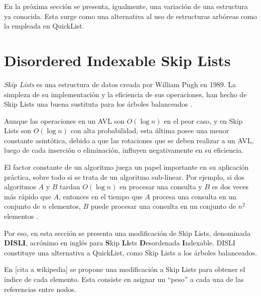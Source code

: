 \documentclass[a4paper,10pt,twocolumn]{article}
\begin{document}
  En la próxima sección se presenta, igualmente, una variación de una estructura ya 
  conocida. Esta surge como una alternativa al uso de estructuras arbóreas como la 
  empleada en QuickList.
\section{Disordered Indexable Skip Lists}\label{sec:disli}
  \textit{Skip Lists} es una estructura de datos creada por William Pugh en 1989. La 
  simpleza de su implementación y la eficiencia de sus operaciones, han hecho de Skip Lists
  una buena sustituta para los árboles balanceados \cite{Pugh}. 
  
  Aunque las operaciones en un AVL son $ O(\log n) $ en el peor caso, y en Skip Lists son $ 
  O(\log n) $ con alta probabilidad, esta última posee una menor constante asintótica, 
  debido a que las rotaciones que se deben realizar a un AVL, luego de cada inserción 
  o eliminación, influyen negativamente en su eficiencia.
  
  El factor constante de un algoritmo juega un papel importante en su aplicación práctica,
  sobre todo si se trata de un algoritmo sub-linear. Por ejemplo, si dos algoritmos $ A $ y
  $ B $ tardan $ O(\log n) $ en procesar una consulta y $ B $ es dos veces más rápido que 
  $ A $, entonces en el tiempo que $ A $ procesa una consulta en un conjunto de $ n $ 
  elementos, $ B $ puede procesar una consulta en un conjunto de $ n^2 $ elementos 
  \cite{Pugh}.
  
  Por eso, en esta sección se presenta una modificación de Skip Lists, denominada 
  \textbf{DISLI}, acrónimo en inglés para \textbf{S}kip \textbf{Li}sts \textbf{D}esordenada 
  \textbf{I}ndexable. DISLI constituye una alternativa a QuickList, como Skip Lists a los 
  árboles balanceados.
  
  En [cita a wikipedia] se propone una modificación a Skip Lists para obtener el índice
  de cada elemento. Esta consiste en asignar un ``peso'' a cada una de las referencias entre
  nodos. 
  
\end{document}
